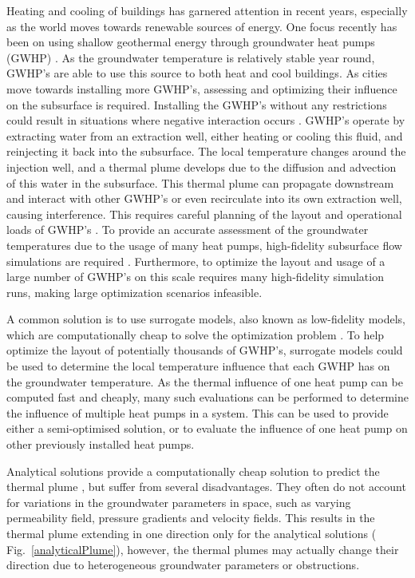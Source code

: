 \documentclass{article} %
\begin{document}
Heating and cooling of buildings has garnered attention in recent years, especially as the world moves towards renewable sources of energy. 
One focus recently has been on using shallow geothermal energy through groundwater heat pumps (GWHP) \citep{Halilovic2022}. 
As the groundwater temperature is relatively stable year round, GWHP's are able to use this source to both heat and cool buildings. %
As cities move towards installing more GWHP's, assessing and optimizing their influence on the subsurface is required. 
Installing the GWHP's without any restrictions could result in situations where negative interaction occurs \citep{Garcia2020, Daemi2019}. 
GWHP's operate by extracting water from an extraction well, either heating or cooling this fluid, and reinjecting it back into the subsurface.  
The local temperature changes around the injection well, and a thermal plume develops due to the diffusion and advection of this water in the subsurface. 
This thermal plume can propagate downstream and interact with other GWHP's or even recirculate into its own extraction well, causing interference. 
This requires careful planning of the layout and operational loads of GWHP's \citep{Beck2013}. 
To provide an accurate assessment of the groundwater temperatures due to the usage of many heat pumps, high-fidelity subsurface flow simulations are required \citep{Meng2019}. 
Furthermore, to optimize the layout and usage of a large number of GWHP's on this scale requires many high-fidelity simulation runs, making large optimization scenarios infeasible.

A common solution is to use surrogate models, also known as low-fidelity models, which are computationally cheap to solve the optimization problem \citep{Sbai2019, Nagoor2019, Robinson2012}. 
To help optimize the layout of potentially thousands of GWHP's, surrogate models could be used to determine the local temperature influence that each GWHP has on the groundwater temperature. 
As the thermal influence of one heat pump can be computed fast and cheaply, many such evaluations can be performed to determine the influence of multiple heat pumps in a system. 
This can be used to provide either a semi-optimised solution, or to evaluate the influence of one heat pump on other previously installed heat pumps. 

Analytical solutions provide a computationally cheap solution to predict the thermal plume \citep{Pophillat2020}, but suffer from several disadvantages. 
They often do not account for variations in the groundwater parameters in space, such as varying permeability field, pressure gradients and velocity fields. 
This results in the thermal plume extending in one direction only for the analytical solutions ( Fig.~\ref{analyticalPlume}), however, the thermal plumes may actually change their direction due to heterogeneous groundwater parameters or obstructions. 
\end{document}
